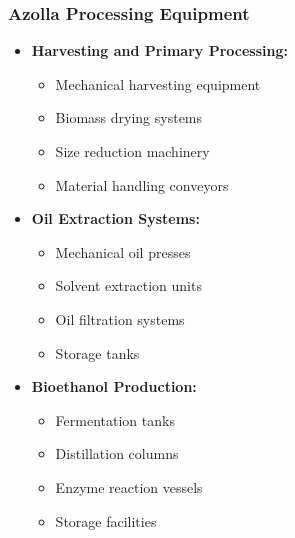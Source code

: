 \subsubsection{Azolla Processing Equipment}
\begin{itemize}
    \item \textbf{Harvesting and Primary Processing:}
    \begin{itemize}
        \item Mechanical harvesting equipment
        \item Biomass drying systems
        \item Size reduction machinery
        \item Material handling conveyors
    \end{itemize}
    
    \item \textbf{Oil Extraction Systems:}
    \begin{itemize}
        \item Mechanical oil presses
        \item Solvent extraction units
        \item Oil filtration systems
        \item Storage tanks
    \end{itemize}
    
    \item \textbf{Bioethanol Production:}
    \begin{itemize}
        \item Fermentation tanks
        \item Distillation columns
        \item Enzyme reaction vessels
        \item Storage facilities
    \end{itemize}
\end{itemize}

